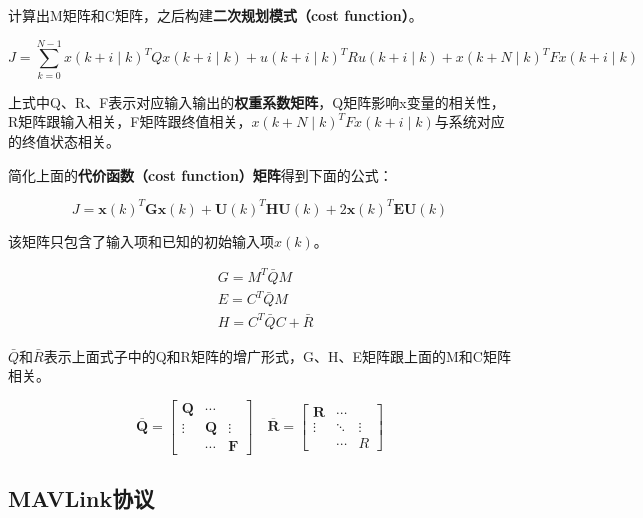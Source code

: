 计算出M矩阵和C矩阵，之后构建\textbf{二次规划模式（cost function）}\cite{ArtE7}。

\begin{equation}
J=\sum_{k=0}^{N-1} x(k+i \mid k)^{T} Q x(k+i \mid k)+u(k+i \mid k)^{T} R u(k+i \mid k)+x(k+N \mid k)^{T} F x(k+i \mid k)
\end{equation}

上式中Q、R、F表示对应输入输出的\textbf{权重系数矩阵}，Q矩阵影响x变量的相关性，R矩阵跟输入相关，F矩阵跟终值相关，$x(k+N \mid k)^{T} F x(k+i \mid k)$与系统对应的终值状态相关。

简化上面的\textbf{代价函数（cost function）矩阵}得到下面的公式：

\begin{equation}
J=\boldsymbol{x}(k)^{T} \boldsymbol{G} \boldsymbol{x}(k)+\boldsymbol{U}(k)^{T} \boldsymbol{H} \boldsymbol{U}(k)+2 \boldsymbol{x}(k)^{T} \boldsymbol{E} \boldsymbol{U}(k)
\end{equation}

该矩阵只包含了输入项和已知的初始输入项$x(k)$。

\begin{equation}
\begin{aligned}&G=M^{T} \bar{Q} M \\&E=C^{T} \bar{Q} M \\&H=C^{T} \bar{Q} C+\bar{R}\end{aligned}
\end{equation}

$\bar{Q}$和$\bar{R}$表示上面式子中的Q和R矩阵的增广形式，G、H、E矩阵跟上面的M和C矩阵相关。

\begin{equation}
\overline{\boldsymbol{Q}}=\left[\begin{array}{ccc}\boldsymbol{Q} & \cdots & \\\vdots & \boldsymbol{Q} & \vdots \\& \cdots & \boldsymbol{F}\end{array}\right] \quad \overline{\boldsymbol{R}}=\left[\begin{array}{ccc}\boldsymbol{R} & \cdots & \\\vdots & \ddots & \vdots \\& \cdots & R\end{array}\right]
\end{equation}

\subsection{MAVLink协议}

